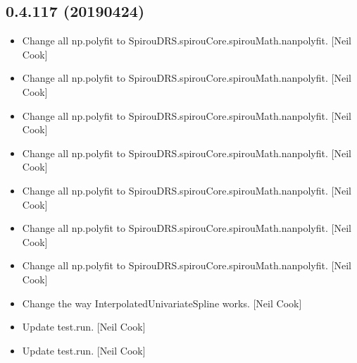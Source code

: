 \documentclass[a4paper,10pt,english]{report}
\begin{document}
\subsection{0.4.117 (2019\sphinxhyphen{}04\sphinxhyphen{}24)}
\label{\detokenize{misc/changelog:id162}}\begin{itemize}
\item {} 
Change all np.polyfit to SpirouDRS.spirouCore.spirouMath.nanpolyfit.
{[}Neil Cook{]}

\item {} 
Change all np.polyfit to SpirouDRS.spirouCore.spirouMath.nanpolyfit.
{[}Neil Cook{]}

\item {} 
Change all np.polyfit to SpirouDRS.spirouCore.spirouMath.nanpolyfit.
{[}Neil Cook{]}

\item {} 
Change all np.polyfit to SpirouDRS.spirouCore.spirouMath.nanpolyfit.
{[}Neil Cook{]}

\item {} 
Change all np.polyfit to SpirouDRS.spirouCore.spirouMath.nanpolyfit.
{[}Neil Cook{]}

\item {} 
Change all np.polyfit to SpirouDRS.spirouCore.spirouMath.nanpolyfit.
{[}Neil Cook{]}

\item {} 
Change all np.polyfit to SpirouDRS.spirouCore.spirouMath.nanpolyfit.
{[}Neil Cook{]}

\item {} 
Change the way InterpolatedUnivariateSpline works. {[}Neil Cook{]}

\item {} 
Update test.run. {[}Neil Cook{]}

\item {} 
Update test.run. {[}Neil Cook{]}

\end{itemize}
\end{document}
